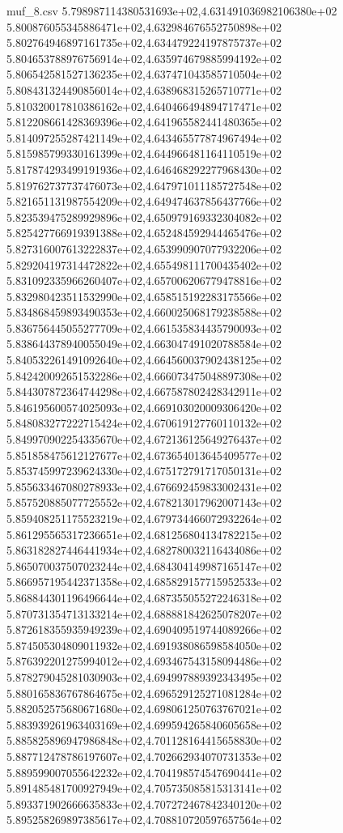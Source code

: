 \begin{filecontents*}{muf_8.csv}
5.798987114380531693e+02,4.631491036982106380e+02
5.800876055345886471e+02,4.632984676552750898e+02
5.802764946897161735e+02,4.634479224197875737e+02
5.804653788976756914e+02,4.635974679885994192e+02
5.806542581527136235e+02,4.637471043585710504e+02
5.808431324490856014e+02,4.638968315265710771e+02
5.810320017810386162e+02,4.640466494894717471e+02
5.812208661428369396e+02,4.641965582441480365e+02
5.814097255287421149e+02,4.643465577874967494e+02
5.815985799330161399e+02,4.644966481164110519e+02
5.817874293499191936e+02,4.646468292277968430e+02
5.819762737737476073e+02,4.647971011185727548e+02
5.821651131987554209e+02,4.649474637856437766e+02
5.823539475289929896e+02,4.650979169332304082e+02
5.825427766919391388e+02,4.652484592944465476e+02
5.827316007613222837e+02,4.653990907077932206e+02
5.829204197314472822e+02,4.655498111700435402e+02
5.831092335966260407e+02,4.657006206779478816e+02
5.832980423511532990e+02,4.658515192283175566e+02
5.834868459893490353e+02,4.660025068179238588e+02
5.836756445055277709e+02,4.661535834435790093e+02
5.838644378940055049e+02,4.663047491020788584e+02
5.840532261491092640e+02,4.664560037902438125e+02
5.842420092651532286e+02,4.666073475048897308e+02
5.844307872364744298e+02,4.667587802428342911e+02
5.846195600574025093e+02,4.669103020009306420e+02
5.848083277222715424e+02,4.670619127760110132e+02
5.849970902254335670e+02,4.672136125649276437e+02
5.851858475612127677e+02,4.673654013645409577e+02
5.853745997239624330e+02,4.675172791717050131e+02
5.855633467080278933e+02,4.676692459833002431e+02
5.857520885077725552e+02,4.678213017962007143e+02
5.859408251175523219e+02,4.679734466072932264e+02
5.861295565317236651e+02,4.681256804134782215e+02
5.863182827446441934e+02,4.682780032116434086e+02
5.865070037507023244e+02,4.684304149987165147e+02
5.866957195442371358e+02,4.685829157715952533e+02
5.868844301196496644e+02,4.687355055272246318e+02
5.870731354713133214e+02,4.688881842625078207e+02
5.872618355935949239e+02,4.690409519744089266e+02
5.874505304809011932e+02,4.691938086598584050e+02
5.876392201275994012e+02,4.693467543158094486e+02
5.878279045281030903e+02,4.694997889392343495e+02
5.880165836767864675e+02,4.696529125271081284e+02
5.882052575680671680e+02,4.698061250763767021e+02
5.883939261963403169e+02,4.699594265840605658e+02
5.885825896947986848e+02,4.701128164415658830e+02
5.887712478786197607e+02,4.702662934070731353e+02
5.889599007055642232e+02,4.704198574547690441e+02
5.891485481700927949e+02,4.705735085815313141e+02
5.893371902666635833e+02,4.707272467842340120e+02
5.895258269897385617e+02,4.708810720597657564e+02

\end{filecontents*}
